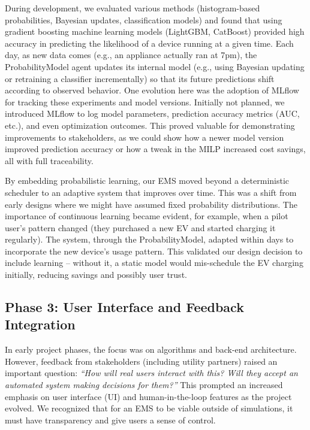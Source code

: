 \documentclass[12pt,a4paper]{article}
\begin{document}
During development, we evaluated various methods (histogram-based probabilities, Bayesian updates, classification models) and found that using gradient boosting machine learning models (LightGBM, CatBoost) provided high accuracy in predicting the likelihood of a device running at a given time. Each day, as new data comes (e.g., an appliance actually ran at 7pm), the ProbabilityModel agent updates its internal model (e.g., using Bayesian updating or retraining a classifier incrementally) so that its future predictions shift according to observed behavior. One evolution here was the adoption of MLflow for tracking these experiments and model versions. Initially not planned, we introduced MLflow to log model parameters, prediction accuracy metrics (AUC, etc.), and even optimization outcomes. This proved valuable for demonstrating improvements to stakeholders, as we could show how a newer model version improved prediction accuracy or how a tweak in the MILP increased cost savings, all with full traceability.

By embedding probabilistic learning, our EMS moved beyond a deterministic scheduler to an adaptive system that improves over time. This was a shift from early designs where we might have assumed fixed probability distributions. The importance of continuous learning became evident, for example, when a pilot user’s pattern changed (they purchased a new EV and started charging it regularly). The system, through the ProbabilityModel, adapted within days to incorporate the new device’s usage pattern. This validated our design decision to include learning – without it, a static model would mis-schedule the EV charging initially, reducing savings and possibly user trust.

\subsection{Phase 3: User Interface and Feedback Integration}
In early project phases, the focus was on algorithms and back-end architecture. However, feedback from stakeholders (including utility partners) raised an important question: \textit{“How will real users interact with this? Will they accept an automated system making decisions for them?”} This prompted an increased emphasis on user interface (UI) and human-in-the-loop features as the project evolved. We recognized that for an EMS to be viable outside of simulations, it must have transparency and give users a sense of control.
\end{document}
